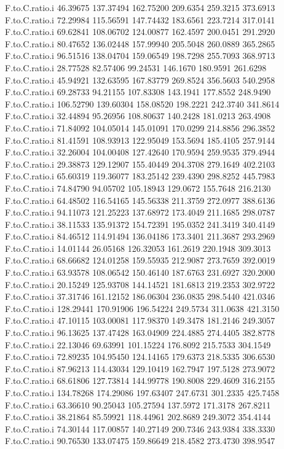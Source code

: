 \documentclass[11pt]{article} %
\begin{document}
\begin{Schunk}
\begin{Soutput}
F.to.C.ratio.i  46.39675 137.37494 162.75200 209.6354 259.3215 373.6913
F.to.C.ratio.i  72.29984 115.56591 147.74432 183.6561 223.7214 317.0141
F.to.C.ratio.i  69.62841 108.06702 124.00877 162.4597 200.0451 291.2920
F.to.C.ratio.i  80.47652 136.02448 157.99940 205.5048 260.0889 365.2865
F.to.C.ratio.i  96.51516 138.04704 159.06549 198.7298 255.7093 368.9713
F.to.C.ratio.i  28.77528  82.57406  99.24531 146.1670 180.9591 261.6298
F.to.C.ratio.i  45.94921 132.63595 167.83779 269.8524 356.5603 540.2958
F.to.C.ratio.i  69.28733  94.21155 107.83308 143.1941 177.8552 248.9490
F.to.C.ratio.i 106.52790 139.60304 158.08520 198.2221 242.3740 341.8614
F.to.C.ratio.i  32.44894  95.26956 108.80637 140.2428 181.0213 263.4908
F.to.C.ratio.i  71.84092 104.05014 145.01091 170.0299 214.8856 296.3852
F.to.C.ratio.i  81.41591 108.93913 122.95049 153.5694 185.4105 257.9144
F.to.C.ratio.i  32.26004 104.00408 127.42640 170.9594 259.9535 379.4944
F.to.C.ratio.i  29.38873 129.12907 155.40449 204.3708 279.1649 402.2103
F.to.C.ratio.i  65.60319 119.36077 183.25142 239.4390 298.8252 445.7983
F.to.C.ratio.i  74.84790  94.05702 105.18943 129.0672 155.7648 216.2130
F.to.C.ratio.i  64.48502 116.54165 145.56338 211.3759 272.0977 388.6136
F.to.C.ratio.i  94.11073 121.25223 137.68972 173.4049 211.1685 298.0787
F.to.C.ratio.i  38.11533 135.91372 154.72391 195.0352 241.3419 340.4149
F.to.C.ratio.i  84.46512 114.91494 136.04186 173.3401 211.3687 293.2969
F.to.C.ratio.i  14.01144  26.05168 126.32053 161.2619 220.1948 309.3013
F.to.C.ratio.i  68.66682 124.01258 159.55935 212.9087 273.7659 392.0019
F.to.C.ratio.i  63.93578 108.06542 150.46140 187.6763 231.6927 320.2000
F.to.C.ratio.i  20.15249 125.93708 144.14521 181.6813 219.2353 302.9722
F.to.C.ratio.i  37.31746 161.12152 186.06304 236.0835 298.5440 421.0346
F.to.C.ratio.i 128.29441 170.91906 196.54224 249.5734 311.0638 421.3150
F.to.C.ratio.i  47.10115 103.00081 117.98370 149.3478 181.2146 249.3057
F.to.C.ratio.i  96.13625 137.47428 163.04909 224.4885 274.4405 382.8778
F.to.C.ratio.i  22.13046  69.63991 101.15224 176.8092 215.7533 304.1549
F.to.C.ratio.i  72.89235 104.95450 124.14165 179.6373 218.5335 306.6530
F.to.C.ratio.i  87.96213 114.43034 129.10419 162.7947 197.5128 273.9072
F.to.C.ratio.i  68.61806 127.73814 144.99778 190.8008 229.4609 316.2155
F.to.C.ratio.i 134.78268 174.29086 197.63407 247.6731 301.2335 425.7458
F.to.C.ratio.i  63.36610  90.25043 105.27594 137.5972 171.3178 267.8211
F.to.C.ratio.i  38.21864  85.59921 118.44961 202.8689 249.3072 354.4144
F.to.C.ratio.i  74.30144 117.00857 140.27149 200.7346 243.9384 338.3330
F.to.C.ratio.i  90.76530 133.07475 159.86649 218.4582 273.4730 398.9547

\end{Soutput}
\end{Schunk}
\end{document}

